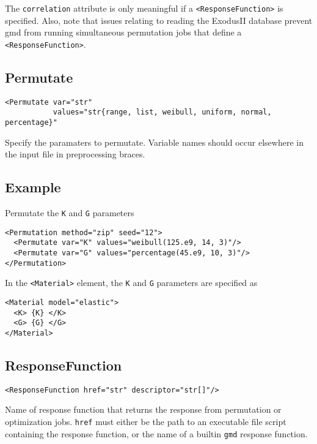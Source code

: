 \documentclass[11pt]{report}
\newcommand{\gmd}{\texttt{gmd}}
\renewcommand{\tag}[1]{\texttt{<#1>}}
\begin{document}
The \texttt{correlation} attribute is only meaningful if a
\tag{ResponseFunction} is specified.  Also, note that issues relating to
reading the ExodusII database prevent gmd from running simultaneous
permutation jobs that define a \tag{ResponseFunction}.


\subsection{Permutate}
\begin{verbatim}
<Permutate var="str"
           values="str{range, list, weibull, uniform, normal, percentage}"
\end{verbatim}
%
Specify the paramaters to permutate. Variable names should occur elsewhere in
the input file in preprocessing braces.

\subsection{Example}
Permutate the \texttt{K} and \texttt{G} parameters
%
\begin{verbatim}
<Permutation method="zip" seed="12">
  <Permutate var="K" values="weibull(125.e9, 14, 3)"/>
  <Permutate var="G" values="percentage(45.e9, 10, 3)"/>
</Permutation>
\end{verbatim}

In the \tag{Material} element, the \texttt{K} and \texttt{G} parameters are
specified as
%
\begin{verbatim}
<Material model="elastic">
  <K> {K} </K>
  <G> {G} </G>
</Material>
\end{verbatim}

\subsection{ResponseFunction}
\begin{verbatim}
<ResponseFunction href="str" descriptor="str[]"/>
\end{verbatim}
Name of response function that returns the response from permutation or
optimization jobs. \texttt{href} must either be the path to an executable file
script containing the response function, or the name of a builtin \gmd{}
response function.
\end{document}
